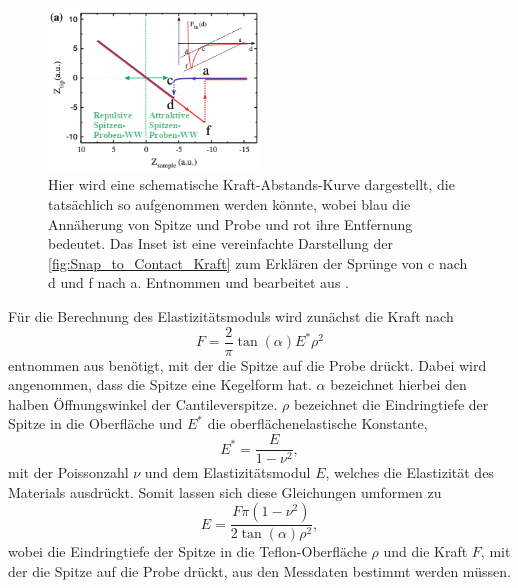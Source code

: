     \begin{figure}[H]
        \centering\captionsetup{format=plain}
        \includegraphics[width=0.5\textwidth]{bilder/Kraft_Abstands_Kurve.png}
        \caption{Hier wird eine schematische Kraft-Abstands-Kurve dargestellt, die tatsächlich so aufgenommen werden könnte, wobei blau die Annäherung von Spitze und Probe und rot ihre Entfernung bedeutet. Das Inset ist eine vereinfachte Darstellung der \autoref{fig:Snap_to_Contact_Kraft} zum Erklären der Sprünge von c nach d und f nach a. Entnommen und bearbeitet aus \cite{voigtlaender}.}
        \label{fig:Kraft_Abstands_Kurve}
    \end{figure}
    \FloatBarrier
    Für die Berechnung des Elastizitätsmoduls wird zunächst die Kraft nach
    \begin{equation}
        F=\frac{2}{\pi}\tan(\alpha)E^*\rho^2
    \end{equation}
    entnommen aus \cite{Elasti} benötigt, mit der die Spitze auf die Probe drückt.
    Dabei wird angenommen, dass die Spitze eine Kegelform hat.
    $\alpha$ bezeichnet hierbei den halben Öffnungswinkel der Cantileverspitze.
    $\rho$ bezeichnet die Eindringtiefe der Spitze in die Oberfläche und $E^*$ die oberflächenelastische Konstante,
    \begin{equation}
        E^*=\frac{E}{1-\nu^2},
    \end{equation}
    mit der Poissonzahl $\nu$ und dem Elastizitätsmodul $E$, welches die Elastizität des Materials ausdrückt.
    Somit lassen sich diese Gleichungen umformen zu
    \begin{equation}
        E=\frac{F\pi(1-\nu^2)}{2\tan(\alpha)\rho^2},
        \label{eqn:Elastizitaetsmodul}
    \end{equation}
    wobei die Eindringtiefe der Spitze in die Teflon-Oberfläche $\rho$ und die Kraft $F$, mit der die Spitze auf die Probe drückt, aus den Messdaten bestimmt werden müssen.
    
